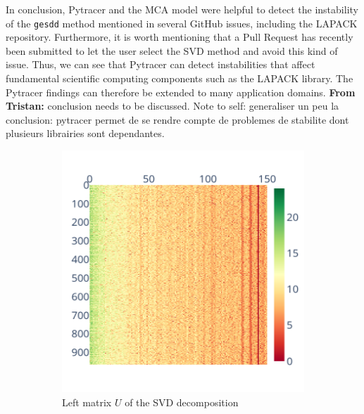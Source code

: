 \documentclass[11pt]{article}
\newcommand{\tristan}[1]{\color{orange}\textbf{From Tristan:} #1\color{black}\xspace}
\begin{document}
In conclusion, Pytracer and the MCA model were helpful to detect the instability of the \texttt{gesdd} method mentioned in several GitHub issues, including the LAPACK repository. Furthermore, it is worth mentioning that a Pull Request has recently been submitted to let the user select the SVD method and avoid this kind of issue. Thus, we can see that Pytracer can detect instabilities that affect fundamental scientific computing components such as the LAPACK library. The Pytracer findings can therefore be extended to many application domains.
\tristan{conclusion needs to be discussed. Note to self: generaliser un peu la conclusion: pytracer permet de se rendre compte de problemes de stabilite dont plusieurs librairies sont dependantes.}



\begin{figure}
    \centering
    \begin{subfigure}{0.3\linewidth}
    \includegraphics[width=\linewidth]{figure/face_recognition/randomized_svd_ret_U_sig_zoom.png}
    \caption{Left matrix $U$ of the SVD decomposition}
    \label{fig:randomized_svd_U}
    \end{subfigure}
    \begin{subfigure}{0.3\linewidth}

\end{subfigure}
\end{figure}
\end{document}
